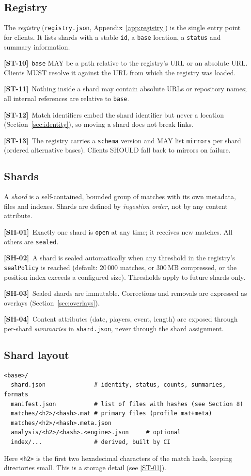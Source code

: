 \documentclass[11pt,a4paper]{article}
\newcommand{\kw}[1]{\textit{#1}\index{#1}}
\newcommand{\req}[2]{\par\smallskip\noindent\hypertarget{#1}{}\textbf{[#1]}\ #2\par}
\newcommand{\rref}[1]{\hyperlink{#1}{[#1]}}
\begin{document}
\subsection{Registry}
The \kw{registry} (\texttt{registry.json}, Appendix~\ref{app:registry}) is the single entry point for clients. It lists shards with a stable \texttt{id}, a \texttt{base} location, a \texttt{status} and summary information.
\req{ST-10}{\texttt{base} MAY be a path relative to the registry's URL or an absolute URL. Clients MUST resolve it against the URL from which the registry was loaded.}
\req{ST-11}{Nothing inside a shard may contain absolute URLs or repository names; all internal references are relative to \texttt{base}.}
\req{ST-12}{Match identifiers embed the shard identifier but never a location (Section~\ref{sec:identity}), so moving a shard does not break links.}
\req{ST-13}{The registry carries a \texttt{schema} version and MAY list \texttt{mirrors} per shard (ordered alternative bases). Clients SHOULD fall back to mirrors on failure.}

\subsection{Shards}
A \kw{shard} is a self-contained, bounded group of matches with its own metadata, files and indexes. Shards are defined by \emph{ingestion order}, not by any content attribute.
\req{SH-01}{Exactly one shard is \texttt{open} at any time; it receives new matches. All others are \texttt{sealed}.}
\req{SH-02}{A shard is sealed automatically when any threshold in the registry's \texttt{sealPolicy} is reached (default: 20\,000 matches, or 300\,MB compressed, or the position index exceeds a configured size). Thresholds apply to future shards only.}
\req{SH-03}{Sealed shards are immutable. Corrections and removals are expressed as overlays (Section~\ref{sec:overlays}).}
\req{SH-04}{Content attributes (date, players, event, length) are exposed through per-shard \emph{summaries} in \texttt{shard.json}, never through the shard assignment.}

\subsection{Shard layout}
\begin{lstlisting}
<base>/
  shard.json              # identity, status, counts, summaries, formats
  manifest.json           # list of files with hashes (see Section 8)
  matches/<h2>/<hash>.mat # primary files (profile mat+meta)
  matches/<h2>/<hash>.meta.json
  analysis/<h2>/<hash>.<engine>.json     # optional
  index/...               # derived, built by CI
\end{lstlisting}
Here \texttt{<h2>} is the first two hexadecimal characters of the match hash, keeping directories small. This is a storage detail (see \rref{ST-01}).
\end{document}
